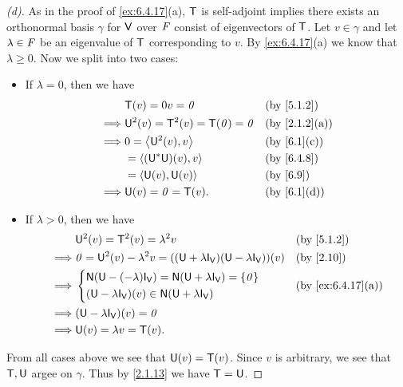 \begin{proof}[(d)]
  As in the proof of \cref{ex:6.4.17}(a), \(\mathsf{T}\) is self-adjoint implies there exists an orthonormal basis \(\gamma\) for \(\mathsf{V}\) over \(\mathit{F}\) consist of eigenvectors of \(\mathsf{T}\).
  Let \(v \in \gamma\) and let \(\lambda \in \mathit{F}\) be an eigenvalue of \(\mathsf{T}\) corresponding to \(v\).
  By \cref{ex:6.4.17}(a) we know that \(\lambda \geq 0\).
  Now we split into two cases:
  \begin{itemize}
    \item If \(\lambda = 0\), then we have
          \begin{align*}
                     & \T(v) = 0v = \zv                  &  & \text{(by \cref{5.1.2})}    \\
            \implies & \U^2(v) = \T^2(v) = \T(\zv) = \zv &  & \text{(by \cref{2.1.2}(a))} \\
            \implies & 0 = \inn{\U^2(v), v}              &  & \text{(by \cref{6.1}(c))}   \\
                     & = \inn{(\U^* \U)(v), v}           &  & \text{(by \cref{6.4.8})}    \\
                     & = \inn{\U(v), \U(v)}              &  & \text{(by \cref{6.9})}      \\
            \implies & \U(v) = \zv = \T(v).              &  & \text{(by \cref{6.1}(d))}
          \end{align*}
    \item If \(\lambda > 0\), then we have
          \begin{align*}
                     & \U^2(v) = \T^2(v) = \lambda^2 v                                                                           &  & \text{(by \cref{5.1.2})} \\
            \implies & \zv = \U^2(v) - \lambda^2 v = ((\U + \lambda \IT[\V]) (\U - \lambda \IT[\V]))(v)                          &  & \text{(by \cref{2.10})}  \\
            \implies & \begin{dcases}
                         \ns{\U - (-\lambda) \IT[\V]} = \ns{\U + \lambda \IT[\V]} = \set{\zv} \\
                         (\U - \lambda \IT[\V])(v) \in \ns{\U + \lambda \IT[\V]}
                       \end{dcases} &  & \text{(by \cref{ex:6.4.17}(a))}                                  \\
            \implies & (\U - \lambda \IT[\V])(v) = \zv                                                                                                         \\
            \implies & \U(v) = \lambda v = \T(v).
          \end{align*}
  \end{itemize}
  From all cases above we see that \(\mathsf{U}(v) = \mathsf{T}(v)\).
  Since \(v\) is arbitrary, we see that \(\mathsf{T}, \mathsf{U}\) argee on \(\gamma\).
  Thus by \cref{2.1.13} we have \(\mathsf{T} = \mathsf{U}\).
\end{proof}

